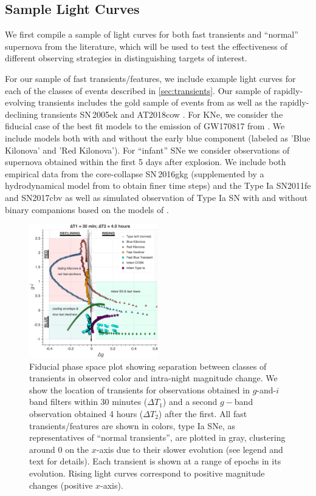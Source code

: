 \documentclass[letterpaper,longauthor,trackchanges,twocolumn,onecolappendix,sort&compress]{aastex62}
\newcommand{\dtone}{\ensuremath{\Delta T_1}}
\newcommand{\dttwo}{\ensuremath{\Delta T_2}}
\begin{document}
\subsection{Sample Light Curves}

We first compile a sample of light curves for both fast transients and ``normal'' supernova from the literature, which will be used to test the effectiveness of different observing strategies in distinguishing targets of interest. 

For our sample of fast transients/features, we include example light curves for each of the classes of events described in \autoref{sec:transients}.
Our sample of rapidly-evolving transients includes the gold sample of events from \cite{Drout2014} as well as the rapidly-declining transients SN\,2005ek \citep{Drout2013} and AT2018cow \citep{Margutti2018}. For KNe, we consider the fiducial case of the best fit models to the emission of GW170817 from \citet{Villar2017}. We include models both with and without the early blue component (labeled as 'Blue Kilonova' and 'Red Kilonova'). For ``infant'' SNe we consider observations of supernova obtained within the first 5 days after explosion. We include both empirical data from the core-collapse SN\,2016gkg (supplemented by a hydrodynamical model from \citealt{Piro2016} to obtain finer time steps) and the Type Ia SN2011fe and SN2017cbv \citep{Graham2015,Hosseinzadeh2017} as well as simulated observation of Type Ia SN with and without binary companions based on the models of \citet{Kasen2010}.

\begin{figure}[!t]
\begin{center}
\includegraphics[width=0.5\textwidth]{figures/LSST_PhaseSpace.png}
\caption{Fiducial phase space plot showing separation between classes of transients in observed color and intra-night magnitude change. We show the location of transients for observations obtained in $g$-and-$i$ band filters within 30 minutes (\dtone) and a second $g-$band observation obtained 4 hours (\dttwo) after the first. All fast transients/features are shown in colors, type Ia SNe, as representatives of ``normal transients'', are plotted in gray, clustering around 0 on the $x$-axis due to their slower evolution (see legend and text for details). Each transient is shown at a range of epochs in its evolution. Rising light curves correspond to positive magnitude changes (positive $x$-axis).  }\label{fig:phasespace}
\end{center}
\end{figure}
\end{document}
